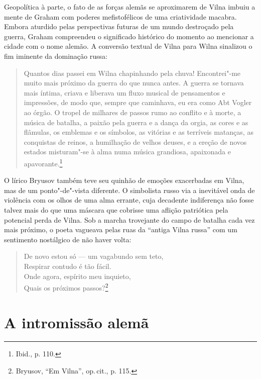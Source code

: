 Geopolítica à parte, o fato de as forças alemãs se aproximarem de Vilna
imbuiu a mente de Graham com poderes mefistofélicos de uma criatividade
macabra. Embora aturdido pelas perspectivas futuras de um mundo
destroçado pela guerra, Graham compreendeu o significado histórico do
momento ao mencionar a cidade com o nome alemão. A conversão textual de
Vilna para Wilna sinalizou o fim iminente da dominação russa:

\begin{quote}
Quantos dias passei em Wilna chapinhando pela chuva! Encontrei"-me muito
mais próximo da guerra do que nunca antes. A guerra se tornava mais
íntima, criava e liberava um fluxo musical de pensamentos e impressões,
de modo que, sempre que caminhava, eu era como Abt Vogler ao órgão. O
tropel de milhares de passos rumo ao conflito e à morte, a música de
batalha, a paixão pela guerra e a dança da orgia, as cores e as
flâmulas, os emblemas e os símbolos, as vitórias e as terríveis
matanças, as conquistas de reinos, a humilhação de velhos deuses, e a
ereção de novos estados misturam"-se à alma numa música grandiosa,
apaixonada e apavorante.\footnote{Ibid., p. 110.}
\end{quote}

O lírico Bryusov também teve seu quinhão de emoções exacerbadas em
Vilna, mas de um ponto"-de"-vista diferente. O simbolista russo via a
inevitável onda de violência com os olhos de uma alma errante, cuja
decadente indiferença não fosse talvez mais do que uma máscara que
cobrisse uma aflição patriótica pela potencial perda de Vilna. Sob a
marcha trovejante do campo de batalha cada vez mais próximo, o poeta
vagueava pelas ruas da ``antiga Vilna russa'' com um sentimento
nostálgico de não haver volta:

\begin{verse}
De novo estou só --- um vagabundo sem teto,\\
Respirar contudo é tão fácil.\\
Onde agora, espírito meu inquieto,\\
Quais os próximos passos?\footnote{Bryusov, ``Em Vilna'', op.\,cit., p. 115.}
\end{verse}

%

\chapter{A intromissão alemã}

